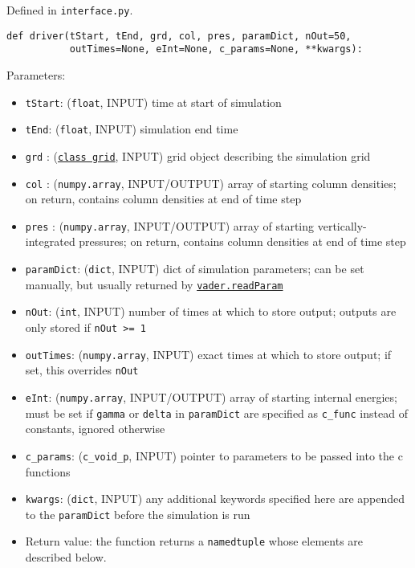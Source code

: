 \documentclass[12pt]{article}
\begin{document}
Defined in \verb=interface.py=.

\begin{verbatim}
def driver(tStart, tEnd, grd, col, pres, paramDict, nOut=50,
           outTimes=None, eInt=None, c_params=None, **kwargs):
\end{verbatim}

Parameters:
\begin{itemize}
\item \texttt{tStart}: (\texttt{float}, INPUT) time at start of simulation
\item \texttt{tEnd}: (\texttt{float}, INPUT) simulation end time
\item \texttt{grd} : (\hyperref[sssec:vader.grid]{\texttt{class grid}}, INPUT) grid object describing the simulation grid
\item \texttt{col} : (\texttt{numpy.array}, INPUT/OUTPUT) array of starting column densities; on return, contains column densities at end of time step
\item \texttt{pres} : (\texttt{numpy.array}, INPUT/OUTPUT) array of starting vertically-integrated pressures; on return, contains column densities at end of time step
\item \texttt{paramDict}: (\texttt{dict}, INPUT) dict of simulation parameters; can be set manually, but usually returned by \hyperref[sssec:vader.readParam]{\texttt{vader.readParam}}
\item \texttt{nOut}: (\texttt{int}, INPUT) number of times at which to store output; outputs are only stored if \verb!nOut >= 1!
\item \texttt{outTimes}: (\texttt{numpy.array}, INPUT) exact times at which to store output; if set, this overrides \verb=nOut=
\item \texttt{eInt}: (\texttt{numpy.array}, INPUT/OUTPUT) array of starting internal energies; must be set if \verb=gamma= or \verb=delta= in \verb=paramDict= are specified as \verb=c_func= instead of constants, ignored otherwise
\item \verb=c_params=: (\verb=c_void_p=, INPUT) pointer to parameters to be passed into the c functions
\item \verb=kwargs=: (\verb=dict=, INPUT) any additional keywords specified here are appended to the \texttt{paramDict} before the simulation is run
\item Return value: the function returns a \verb=namedtuple= whose elements are described below.
\end{itemize}
\end{document}
